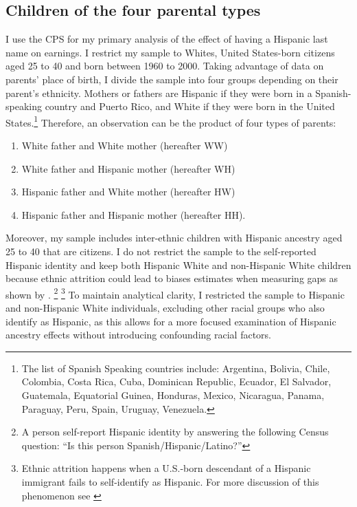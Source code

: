 \subsection{Children of the four parental types}

I use the CPS for my primary analysis of the effect of having a Hispanic last name on earnings. I restrict my sample to Whites, United States-born citizens aged 25 to 40 and born between 1960 to 2000. Taking advantage of data on parents' place of birth, I divide the sample into four groups depending on their parent's ethnicity. Mothers or fathers are Hispanic if they were born in a Spanish-speaking country and Puerto Rico, and White if they were born in the United States.\footnote{The list of Spanish Speaking countries include: Argentina, Bolivia, Chile, Colombia, Costa Rica, Cuba, Dominican Republic, Ecuador, El Salvador, Guatemala, Equatorial Guinea, Honduras, Mexico, Nicaragua, Panama, Paraguay, Peru, Spain, Uruguay, Venezuela.} Therefore, an observation can be the product of four types of parents: 
\begin{enumerate}
\item White father and White mother (hereafter WW) 
\item White father and Hispanic mother (hereafter WH)
\item Hispanic father and White mother (hereafter HW)
\item Hispanic father and Hispanic mother (hereafter HH).
\end{enumerate}

Moreover, my sample includes inter-ethnic children with Hispanic ancestry aged 25 to 40 that are citizens. I do not restrict the sample to the self-reported Hispanic identity and keep both Hispanic White and non-Hispanic White children because ethnic attrition could lead to biases estimates when measuring gaps as shown by \autocite{hadah2024effect}. \footnote{A person self-report Hispanic identity by answering the following Census question: ``Is this person Spanish/Hispanic/Latino?''} \footnote{Ethnic attrition happens when a U.S.-born descendant of a Hispanic immigrant fails to self-identify as Hispanic. For more discussion of this phenomenon see \autocite{antmanEthnicAttritionObserved2016,antmanEthnicAttritionAssimilation2020}} To maintain analytical clarity, I restricted the sample to Hispanic and non-Hispanic White individuals, excluding other racial groups who also identify as Hispanic, as this allows for a more focused examination of Hispanic ancestry effects without introducing confounding racial factors.

